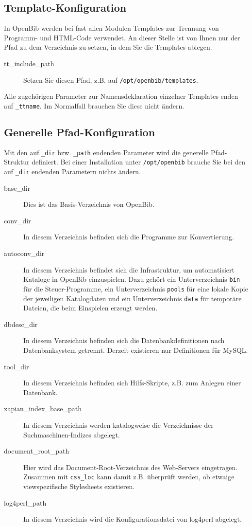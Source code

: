 \documentclass[11pt, twoside, a4paper, BCOR8mm, DIV12, bibtotoc,idxtotoc]{scrbook}
\begin{document}
\subsection{Template-Konfiguration}

In OpenBib werden bei fast allen Modulen Templates zur Trennung von
Programm- und HTML-Code verwendet. An dieser Stelle ist von Ihnen nur
der Pfad zu dem Verzeichnis zu setzen, in dem Sie die Templates
ablegen.

\begin{description}
\item[tt\_include\_path] Setzen Sie diesen Pfad, z.B. auf
  \texttt{/opt/openbib/templates}.
\end{description}

Alle zugehörigen Parameter zur Namensdeklaration einzelner Templates
enden auf \texttt{\_ttname}. Im Normalfall brauchen Sie diese nicht
ändern.


\subsection{Generelle Pfad-Konfiguration}

Mit den auf \texttt{\_dir} bzw. \texttt{\_path} endenden Parameter
wird die generelle Pfad-Struktur definiert. Bei einer Installation
unter \texttt{/opt/openbib} brauche Sie bei den auf \texttt{\_dir}
endenden Parametern nichts ändern.

\begin{description}
\item[base\_dir] Dies ist das Basis-Verzeichnis von OpenBib.
\item[conv\_dir] In diesem Verzeichnis befinden sich die Programme zur
  Konvertierung.
\item[autoconv\_dir] In diesem Verzeichnis befindet sich die
  Infrastruktur, um automatisiert Kataloge in OpenBib
  einzuspielen. Dazu gehört ein Unterverzeichnis \texttt{bin} für
  die Steuer-Programme, ein Unterverzeichnis \texttt{pools} für eine
  lokale Kopie der jeweiligen Katalogdaten und ein Unterverzeichnis
  \texttt{data} für temporäre Dateien, die beim Einspielen erzeugt
  werden.
\item[dbdesc\_dir] In diesem Verzeichnis befinden sich die
  Datenbankdefinitionen nach Datenbanksystem getrennt. Derzeit
  existieren nur Definitionen für MySQL.
\item[tool\_dir] In diesem Verzeichnis befinden sich Hilfs-Skripte,
  z.B. zum Anlegen einer Datenbank.
\item[xapian\_index\_base\_path] In diesem Verzeichnis werden
  katalogweise die Verzeichnisse der Such\-ma\-schinen-Indizes abgelegt.
\item[document\_root\_path] Hier wird das Document-Root-Verzeichnis
  des Web-Servers eingetragen. Zusammen mit \texttt{css\_loc} kann
  damit z.B. überprüft werden, ob etwaige viewspezifische Stylesheets
  existieren.
\item[log4perl\_path] In diesem Verzeichnis wird die
  Konfigurationsdatei von log4perl abgelegt.
\end{description}
\end{document}

